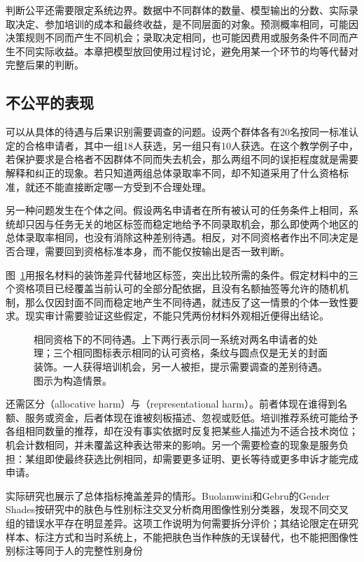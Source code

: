 判断公平还需要限定系统边界。数据中不同群体的数量、模型输出的分数、实际录取决定、参加培训的成本和最终收益，是不同层面的对象。预测概率相同，可能因决策规则不同而产生不同机会；录取决定相同，也可能因费用或服务条件不同而产生不同实际收益。本章把模型放回使用过程讨论，避免用某一个环节的均等代替对完整后果的判断。

\subsection{不公平的表现}
\label{sec:fairness-manifestations}

可以从具体的待遇与后果识别需要调查的问题。设两个群体各有20名按同一标准认定的合格申请者，其中一组18人获选，另一组只有10人获选。在这个教学例子中，若保护要求是合格者不因群体不同而失去机会，那么两组不同的误拒程度就是需要解释和纠正的现象。若只知道两组总体录取率不同，却不知道采用了什么资格标准，就还不能直接断定哪一方受到不合理处理。

另一种问题发生在个体之间。假设两名申请者在所有被认可的任务条件上相同，系统却只因与任务无关的地区标签而稳定地给予不同录取机会，那么即使两个地区的总体录取率相同，也没有消除这种差别待遇。相反，对不同资格者作出不同决定是否合理，需要回到资格标准本身，而不能仅按输出是否一致判断。

图~\ref{fig:trust-fairness-opportunity}用报名材料的装饰差异代替地区标签，突出比较所需的条件。假定材料中的三个资格项目已经覆盖当前认可的全部分配依据，且没有名额抽签等允许的随机机制，那么仅因封面不同而稳定地产生不同待遇，就违反了这一情景的个体一致性要求。现实审计需要验证这些假定，不能只凭两份材料外观相近便得出结论。

\begin{figure}[!htb]
  \centering
  \caption{相同资格下的不同待遇。上下两行表示同一系统对两名申请者的处理；三个相同图标表示相同的认可资格，条纹与圆点仅是无关的封面装饰。一人获得培训机会，另一人被拒，提示需要调查的差别待遇。图示为构造情景。}
  \label{fig:trust-fairness-opportunity}
\end{figure}

还需区分（allocative harm）与（representational harm）。前者体现在谁得到名额、服务或资金，后者体现在谁被刻板描述、忽视或贬低。培训推荐系统可能给予各组相同数量的推荐，却在没有事实依据时反复把某些人描述为不适合技术岗位；机会计数相同，并未覆盖这种表达带来的影响。另一个需要检查的现象是服务负担：某组即使最终获选比例相同，却需要更多证明、更长等待或更多申诉才能完成申请。

实际研究也展示了总体指标掩盖差异的情形。Buolamwini和Gebru的Gender Shades按研究中的肤色与性别标注交叉分析商用图像性别分类器，发现不同交叉组的错误水平存在明显差异。这项工作说明为何需要拆分评价；其结论限定在研究样本、标注方式和当时系统上，不能把肤色当作种族的无误替代，也不能把图像性别标注等同于人的完整性别身份

